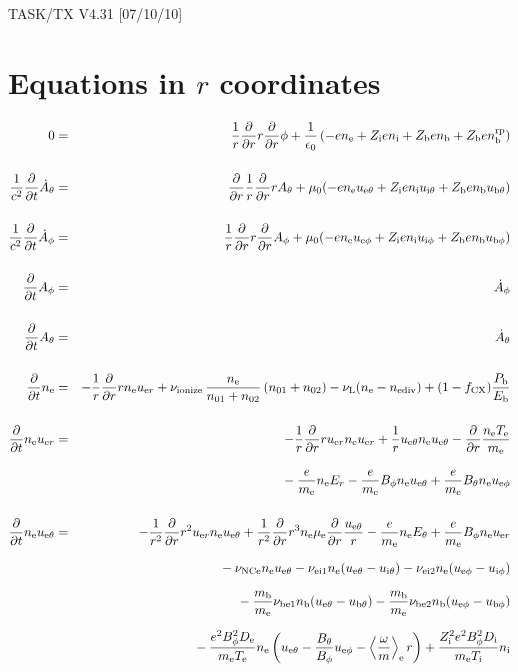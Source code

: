 \documentclass[11pt]{article}
\def\r#1{{\rm#1}}
\def\ddt{\frac{\partial}{\partial t}}
\def\ddr{\frac{\partial}{\partial r}}
\def\ave#1{\left\langle#1\right\rangle}
\def\me{m_\r{e}}
\def\mb{m_\r{b}}
\def\mue{\mu_\r{e}}
\def\De{D_\r{e}}
\def\Di{D_\r{i}}
\def\ne{n_\r{e}}
\def\ni{n_\r{i}}
\def\nb{n_\r{b}}
\def\uer{u_{\r{e}r}}
\def\ueth{u_{\r{e}\theta}}
\def\uith{u_{\r{i}\theta}}
\def\ubth{u_{\r{b}\theta}}
\def\ueph{u_{\r{e}\phi}}
\def\uiph{u_{\r{i}\phi}}
\def\ubph{u_{\r{b}\phi}}
\def\Er{E_r}
\def\Eth{E_\theta}
\def\Bth{B_\theta}
\def\Bph{B_\phi}
\def\Athd{\dot{A}_\theta}
\def\Aphd{\dot{A}_\phi}
\def\Ath{A_\theta}
\def\Aph{A_\phi}
\def\Te{T_\r{e}}
\def\Ti{T_\r{i}}
\def\nna{n_{01}}
\def\nnb{n_{02}}
\def\Zi{Z_\r{i}}
\def\Zb{Z_\r{b}}
\def\Pb{P_\r{b}}
\def\Eb{E_\r{b}}
\def\nbrp{n_\r{b}^\r{rp}}
\def\fCX{f_\r{CX}}
\def\nuNCe{\nu_\r{NCe}}
\def\nuL{\nu_\r{L}}
\def\nuion{\nu_\r{ionize}}
\def\nediv{n_\r{ediv}}
\begin{document}
\begin{center}
TASK/TX V4.31 [07/10/10]
\end{center}

\section{Equations in $r$ coordinates}
\vspace{-5mm}

\begin{eqnarray}
%
%
  0 &=&
%
    \frac{1}{r} \ddr r \ddr \phi
%
  + \frac{1}{\epsilon_0}
%
    \left(-e \ne + \Zi e \ni + \Zb e \nb + \Zb e \nbrp \right)
\\[5mm]
%
%
  \frac{1}{c^2} \ddt \Athd &=&
%
    \ddr \frac{1}{r} \ddr r \Ath
%
  + \mu_0 (-e \ne \ueth + \Zi e \ni \uith + \Zb e \nb \ubth)
\\[5mm]
%
%
  \frac{1}{c^2} \ddt \Aphd &=&
%
  \frac{1}{r} \ddr r \ddr \Aph
%
  + \mu_0 (-e \ne \ueph + \Zi e \ni \uiph + \Zb e \nb \ubph)
%
\\[5mm]
%
%
  \ddt \Aph &=&
%
  \Aphd
\\[5mm]
%
%
  \ddt \Ath &=&
%
  \Athd
\\[5mm]
%
%
  \ddt\ne &=&
%
  - \frac{1}{r} \ddr r \ne \uer 
%
  + \nuion\, \frac{\ne}{\nna+\nnb}\, (\nna+\nnb)
%
  - \nuL (\ne - \nediv)
%
  + (1 - \fCX) \frac{\Pb}{\Eb}
\\[5mm]
%
%
  \ddt \ne \uer &=&
%
  - \frac{1}{r} \ddr r \uer \ne \uer
%
  + \frac{1}{r} \ueth \ne \ueth
%
  - \ddr \frac{\ne \Te}{\me}
\nonumber\\[3mm]&&{}
%
  - \frac{e}{\me} \ne \Er
%
  - \frac{e}{\me} \Bph \ne \ueth
%
  + \frac{e}{\me} \Bth \ne \ueph
\\[5mm]
%
%
  \ddt \ne \ueth &=&
%
  - \frac{1}{r^2} \ddr r^2 \uer \ne \ueth
%
  + \frac{1}{r^2} \ddr r^3 \ne \mue \ddr \frac{\ueth}{r}
%
  - \frac{e}{\me} \ne \Eth
%
  + \frac{e}{\me} \Bph \ne \uer
\nonumber\\[2.5mm]&&{}
%
  - \nuNCe \ne \ueth
%
  - \nu_\r{ei1} \ne (\ueth - \uith)
%
  - \nu_\r{ei2} \ne (\ueph - \uiph)
\nonumber\\[2.5mm]&&{}
%
  - \frac{\mb}{\me} \nu_\r{be1} \nb (\ueth - \ubth)
%
  - \frac{\mb}{\me} \nu_\r{be2} \nb (\ueph - \ubph)
\nonumber\\[2.5mm]&&{}
%
  - \frac{e^2 \Bph^2 \De}{\me\Te}\ne
    \left(\ueth - \frac{\Bth}{\Bph}\ueph - \ave{\frac{\omega}{m}}_\r{e}
     r \right)
%
   + \frac{\Zi^2 e^2 \Bph^2 \Di}{\me\Ti}\ni

\end{eqnarray}
\end{document}
